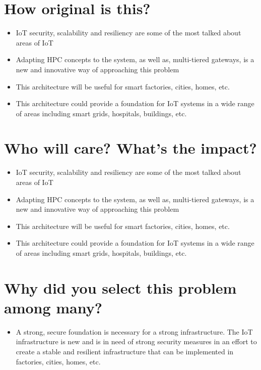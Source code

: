 \documentclass[../main.tex]{subfiles}
\begin{document}
\section{How original is this?}

\begin{itemize}
    \item IoT security, scalability and resiliency are some of the most talked about areas of IoT
    \item Adapting HPC concepts to the system, as well as, multi-tiered gateways, is a new and innovative way of approaching this problem
    \item This architecture will be useful for smart factories, cities, homes, etc.
    \item This architecture could provide a foundation for IoT systems in a wide range of areas including smart grids, hospitals, buildings, etc.

\end{itemize}

\section{Who will care? What's the impact?}

\begin{itemize}
    \item IoT security, scalability and resiliency are some of the most talked about areas of IoT
    \item Adapting HPC concepts to the system, as well as, multi-tiered gateways, is a new and innovative way of approaching this problem
    \item This architecture will be useful for smart factories, cities, homes, etc.
    \item This architecture could provide a foundation for IoT systems in a wide range of areas including smart grids, hospitals, buildings, etc.
\end{itemize}


\section{Why did you select this problem among many?}

\begin{itemize}
    \item A strong, secure foundation is necessary for a strong infrastructure. The IoT infrastructure is new and is in need of strong security measures in an effort to create a stable and resilient infrastructure that can be implemented in factories, cities, homes, etc.
\end{itemize}
\end{document}
